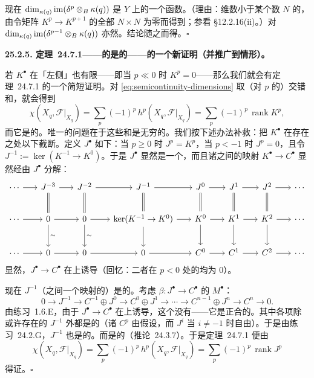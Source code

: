 现在 $\dim_{\kappa(q)}\operatorname{im}(\delta^p\otimes_B\kappa(q))$ 是 $Y$ 上的一个\trLowerSemicontinuous{}函数。（理由：维数小于某个数 $N$ 的\trLocus，由令矩阵 $K^p\to K^{p+1}$ 的全部 $N\times N$ \trMinor{}为零而得到；参看 \S12.2.16(ii)。）对 $\dim_{\kappa(q)}\operatorname{im}(\delta^{p-1}\otimes_B\kappa(q))$ 亦然。结论随之而得。\hfill$\square$

\textbf{25.2.5. \mbox{定理~24.7.1}——\trFlat\trSheaf{}的\trEulerCharacteristic{}是\trLocallyConstant{}的——的一个新证明（并推广到\trProper{}情形）。}

若 $K^{\bullet}$ 在「左侧」也有限——即当 $p\ll 0$ 时 $K^p=0$——那么我们就会有\mbox{定理~24.7.1} 的一个简短证明。对 \eqref{eq:semicontinuity-dimensions} 取（对 $p$ 的）交错和，就会得到
\[
\chi(X_q,\mathscr{F}|_{X_q})=\sum_p(-1)^p\, h^p(X_q,\mathscr{F}|_{X_q})=\sum_p(-1)^p\,\operatorname{rank}K^p,
\]
而它是\trLocallyConstant{}的。唯一的问题在于这些和是无穷的。我们按下述办法补救：把\trComplexN{} $K^{\bullet}$ 在存在\trCohomology{}之处以下截断。定义 $J^{\bullet}$ 如下：当 $p\ge 0$ 时 $J^p=K^p$，当 $p<-1$ 时 $J^p=0$，且令 $J^{-1}:=\ker(K^{-1}\to K^{0})$。于是 $J^{\bullet}$ 显然是一个\trComplexN，而且诸\trComplexes{}之间的映射 $K^{\bullet}\to C^{\bullet}$ 显然经由 $J^{\bullet}$ 分解：
\[
\begin{tikzcd}[row sep=2.2em, column sep=1.7em]
\cdots \ar[r] & J^{-3} \ar[r] \ar[d, equals] & J^{-2} \ar[r] \ar[d, equals] & J^{-1} \ar[r] \ar[d, equals] & J^{0} \ar[r] \ar[d, equals] & J^{1} \ar[r] \ar[d, equals] & J^{2} \ar[r] \ar[d, equals] & \cdots \\
\cdots \ar[r] & 0 \ar[r] \ar[d, "\sim"] & 0 \ar[r] \ar[d, "\sim"] & \ker(K^{-1}\to K^{0}) \ar[r] \ar[d] & K^{0} \ar[r] \ar[d] & K^{1} \ar[r] \ar[d] & K^{2} \ar[r] \ar[d] & \cdots \\
\cdots \ar[r] & 0 \ar[r] & 0 \ar[r] & 0 \ar[r] & C^{0} \ar[r] & C^{1} \ar[r] & C^{2} \ar[r] & \cdots
\end{tikzcd}
\]
显然，$J^{\bullet}\to C^{\bullet}$ 在\trCohomology{}上诱导\trIsomorphism（回忆：二者在 $p<0$ 处的\trCohomology{}均为 $0$）。

现在 $J^{-1}$（\trCoh{}\trModule{}之间一个映射的\trKernel）是\trCoh{}的。考虑 $\beta\colon J^{\bullet}\to C^{\bullet}$ 的\trMappingCone{} $M^{\bullet}$：
\[
0\longrightarrow J^{-1}\longrightarrow C^{-1}\oplus J^{0}\longrightarrow C^{0}\oplus J^{1}\longrightarrow\cdots\longrightarrow C^{n-1}\oplus J^{n}\longrightarrow C^{n}\longrightarrow 0.
\]
由\mbox{练习~1.6.E}，由于 $J^{\bullet}\to C^{\bullet}$ 在\trCohomology{}上诱导\trIsomorphism，这个\trMappingCone{}没有\trCohomology——它是正合的。其中各项除或许存在的 $J^{-1}$ 外都是\trFlat{}的（诸 $C^p$ 由假设\trFlat，而 $J^i$ 当 $i\ne -1$ 时自由）。于是由\mbox{练习~24.2.G}，$J^{-1}$ 也是\trFlat{}的。而\trFlat\trCoherentSheaf{}是\trLocallyFree{}的（\mbox{推论~24.3.7}）。于是\mbox{定理~24.7.1} 便由
\[
\chi(X_q,\mathscr{F}|_{X_q})=\sum_p(-1)^p\, h^p(X_q,\mathscr{F}|_{X_q})=\sum_p(-1)^p\,\operatorname{rank}J^p
\]
得证。\hfill$\square$

